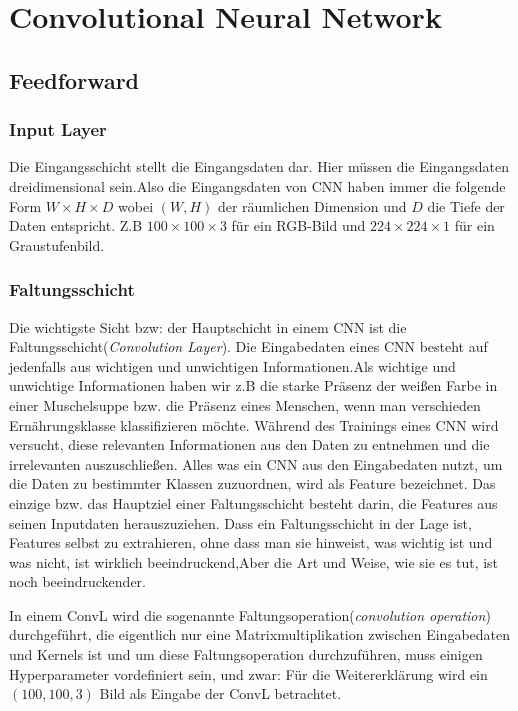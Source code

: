 \documentclass[12pt,a4paper]{scrartcl}
\makeatletter
\numberwithin{equation}{section}
\renewcommand\paragraph{\@startsection{paragraph}{4}{\z@}%
	{-2.5ex\@plus -1ex \@minus -.25ex}%
	{1.25ex \@plus .25ex}%
	{\normalfont\normalsize\bfseries}}
\makeatother
\begin{document}
\section{Convolutional Neural Network}

\subsection{Feedforward }
\subsubsection{Input Layer}\label{InputLayer}
Die Eingangsschicht stellt die Eingangsdaten dar. Hier müssen die Eingangsdaten dreidimensional sein.Also die Eingangsdaten von \ac{CNN}  haben immer die folgende Form $ W\times H\times D $ wobei $ (W, H) $ der räumlichen Dimension und $ D $ die Tiefe der Daten entspricht. Z.B  $ 100\times100 \times3 $ für ein RGB-Bild und $ 224\times224\times1 $ für ein Graustufenbild.


\subsubsection{Faltungsschicht}\label{ConvL}
Die wichtigste Sicht bzw: der Hauptschicht in einem \ac{CNN} ist die Faltungsschicht(\emph{Convolution Layer}).
Die Eingabedaten eines \ac{CNN} besteht auf jedenfalls aus wichtigen und unwichtigen Informationen.Als wichtige und unwichtige Informationen haben wir z.B die starke Präsenz der weißen Farbe in einer Muschelsuppe bzw. die Präsenz eines Menschen, wenn man verschieden Ernährungsklasse klassifizieren möchte. Während des Trainings eines \ac{CNN} wird versucht, diese relevanten Informationen aus den Daten zu entnehmen und die irrelevanten auszuschließen. Alles was ein \ac{CNN} aus den Eingabedaten nutzt, um die Daten zu bestimmter Klassen zuzuordnen, wird als Feature bezeichnet.
Das einzige bzw. das Hauptziel einer Faltungsschicht besteht darin, die Features aus seinen Inputdaten herauszuziehen.
Dass ein Faltungsschicht in der Lage ist, Features selbst zu extrahieren, ohne dass man sie hinweist, was wichtig ist und was nicht, ist wirklich beeindruckend,Aber die Art und Weise, wie sie es tut, ist noch beeindruckender.

In einem \ac{ConvL} wird die sogenannte Faltungsoperation(\emph{convolution operation}) durchgeführt, die eigentlich nur eine Matrixmultiplikation zwischen Eingabedaten und Kernels ist und um diese Faltungsoperation durchzuführen, muss einigen Hyperparameter vordefiniert sein, und zwar:
Für die Weitererklärung wird ein $ (100, 100, 3) $ Bild als Eingabe der \ac{ConvL} betrachtet.
\end{document}
